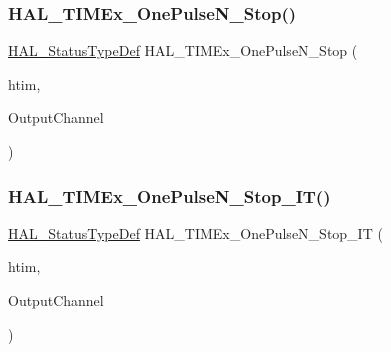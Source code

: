 \subsubsection{\texorpdfstring{H\+A\+L\+\_\+\+T\+I\+M\+Ex\+\_\+\+One\+Pulse\+N\+\_\+\+Stop()}{HAL\_TIMEx\_OnePulseN\_Stop()}}
{\footnotesize\ttfamily \hyperlink{stm32f4xx__hal__def_8h_a63c0679d1cb8b8c684fbb0632743478f}{H\+A\+L\+\_\+\+Status\+Type\+Def} H\+A\+L\+\_\+\+T\+I\+M\+Ex\+\_\+\+One\+Pulse\+N\+\_\+\+Stop (\begin{DoxyParamCaption}\item[{\hyperlink{struct_t_i_m___handle_type_def}{T\+I\+M\+\_\+\+Handle\+Type\+Def} $\ast$}]{htim,  }\item[{uint32\+\_\+t}]{Output\+Channel }\end{DoxyParamCaption})}

\mbox{\label{group___t_i_m_ex___exported___functions___group4_ga5b6f320c18f453054a5409db6b98254e}} 
\subsubsection{\texorpdfstring{H\+A\+L\+\_\+\+T\+I\+M\+Ex\+\_\+\+One\+Pulse\+N\+\_\+\+Stop\+\_\+\+I\+T()}{HAL\_TIMEx\_OnePulseN\_Stop\_IT()}}
{\footnotesize\ttfamily \hyperlink{stm32f4xx__hal__def_8h_a63c0679d1cb8b8c684fbb0632743478f}{H\+A\+L\+\_\+\+Status\+Type\+Def} H\+A\+L\+\_\+\+T\+I\+M\+Ex\+\_\+\+One\+Pulse\+N\+\_\+\+Stop\+\_\+\+IT (\begin{DoxyParamCaption}\item[{\hyperlink{struct_t_i_m___handle_type_def}{T\+I\+M\+\_\+\+Handle\+Type\+Def} $\ast$}]{htim,  }\item[{uint32\+\_\+t}]{Output\+Channel }\end{DoxyParamCaption})}

